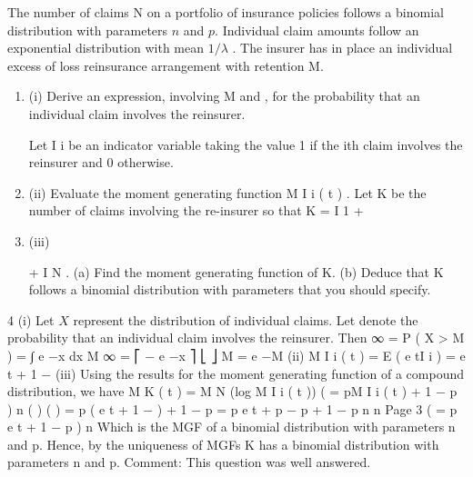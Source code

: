 \documentclass[a4paper,12pt]{article}
\begin{document}
 


The number of claims N on a portfolio of insurance policies follows a binomial
distribution with parameters $n$ and $p$. Individual claim amounts follow an exponential
distribution with mean $1/ \lambda$ . The insurer has in place an individual excess of loss
reinsurance arrangement with retention M.
\begin{enumerate}
\item (i)
Derive an expression, involving M and \lambda, for the probability that an individual
claim involves the reinsurer.

Let I i be an indicator variable taking the value 1 if the ith claim involves the reinsurer
and 0 otherwise.
\item (ii)
Evaluate the moment generating function M I i ( t ) .
Let K be the number of claims involving the re-insurer so that K = I 1 +
\item (iii)


+ I N .
(a) Find the moment generating function of K.
(b) Deduce that K follows a binomial distribution with parameters that you
should specify.

\end{enumerate}

4
(i)
Let $X$ represent the distribution of individual claims. Let denote the probability that an individual claim involves the reinsurer. Then
∞
\pi  = P ( X > M ) =
∫ \lambda e
−\lambda x
dx
M
∞
= ⎡ − e −\lambda x ⎤
⎣
⎦ M
= e −\lambda M
(ii) M I i ( t ) = E ( e tI i ) = \pi  e t + 1 − \pi 
(iii) Using the results for the moment generating function of a compound distribution, we have
M K ( t ) = M N (log M I i ( t ))
(
= pM I i ( t ) + 1 − p
)
n
( )
( )
= p ( \pi  e t + 1 − \pi  ) + 1 − p
= p \pi  e t + p − p \pi  + 1 − p
n
n
Page 3%
(
= p \pi  e t + 1 − p \pi 
)
n
Which is the MGF of a binomial distribution with parameters n and p\pi  .
Hence, by the uniqueness of MGFs K has a binomial distribution with
parameters n and p\pi  .
Comment: This question was well answered.
\end{document}
